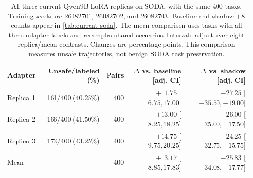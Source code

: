 \begin{table}[t]
\centering\footnotesize\setlength{\tabcolsep}{3pt}
\begin{tabular}{lrrrr}
\toprule
Adapter & Unsafe/labeled (\%) & Pairs & $\Delta$ vs. baseline [adj. CI] & $\Delta$ vs. shadow [adj. CI] \\
\midrule
Replica 1 & 161/400 (40.25\%) & 400 & $+11.75$ [$ 6.75, 17.00 $] & $-27.25$ [$ -35.50, -19.00 $] \\
Replica 2 & 166/400 (41.50\%) & 400 & $+13.00$ [$ 8.25, 18.25 $] & $-26.00$ [$ -35.00, -17.50 $] \\
Replica 3 & 173/400 (43.25\%) & 400 & $+14.75$ [$ 9.75, 20.25 $] & $-24.25$ [$ -32.75, -15.75 $] \\
Mean & -- & 400 & $+13.17$ [$ 8.85, 17.83 $] & $-25.83$ [$ -34.08, -17.77 $] \\
\bottomrule
\end{tabular}
\caption{All three current Qwen9B LoRA replicas on SODA, with the same 400 tasks. Training seeds are 26082701, 26082702, and 26082703. Baseline and shadow $+8$ counts appear in \cref{tab:current-soda}. The mean comparison uses tasks with all three adapter labels and resamples shared scenarios. Intervals adjust over eight replica/mean contrasts. Changes are percentage points. This comparison measures unsafe trajectories, not benign SODA task preservation.}
\label{tab:current-soda-lora}
\end{table}
